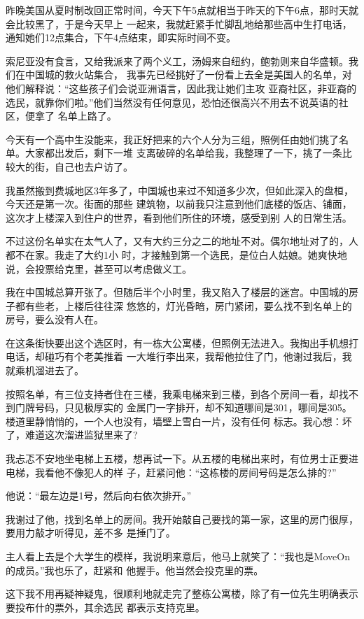 ﻿\documentclass[11pt]{article}
\begin{document}
昨晚美国从夏时制改回正常时间，今天下午5点就相当于昨天的下午6点，那时天就会比较黑了，于是今天早上
一起来，我就赶紧手忙脚乱地给那些高中生打电话，通知她们12点集合，下午4点结束，即实际时间不变。

索尼亚没有食言，又给我派来了两个义工，汤姆来自纽约，鲍勃则来自华盛顿。我们在中国城的救火站集合，
我事先已经挑好了一份看上去全是美国人的名单，对他们解释说：``这些孩子们会说亚洲语言，因此我让她们主攻
亚裔社区，非亚裔的选民，就靠你们啦。''他们当然没有任何意见，恐怕还很高兴不用去不说英语的社区，便拿了
名单上路了。

今天有一个高中生没能来，我正好把来的六个人分为三组，照例任由她们挑了名单。大家都出发后，剩下一堆
支离破碎的名单给我，我整理了一下，挑了一条比较大的街，自己也去户访了。

我虽然搬到费城地区3年多了，中国城也来过不知道多少次，但如此深入的盘桓，今天还是第一次。街面的那些
建筑物，以前我只注意到他们底楼的饭店、铺面，这次才上楼深入到住户的世界，看到他们所住的环境，感受到别
人的日常生活。

不过这份名单实在太气人了，又有大约三分之二的地址不对。偶尔地址对了的，人都不在家。我走了大约1小
时，才接触到第一个选民，是位白人姑娘。她爽快地说，会投票给克里，甚至可以考虑做义工。

我在中国城总算开张了。但随后半个小时里，我又陷入了楼层的迷宫。中国城的房子都有些老，上楼后往往深
悠悠的，灯光昏暗，房门紧闭，要么找不到名单上的房号，要么没有人在。

在这条街快要出这个选区时，有一栋大公寓楼，但照例无法进入。我掏出手机想打电话，却碰巧有个老美推着
一大堆行李出来，我帮他拉住了门，他谢过我后，我就乘机溜进去了。

按照名单，有三位支持者住在三楼，我乘电梯来到三楼，到各个房间一看，却找不到门牌号码，只见极厚实的
金属门一字排开，却不知道哪间是301，哪间是305。楼道里静悄悄的，一个人也没有，墙壁上雪白一片，没有任何
标志。我心想：坏了，难道这次溜进监狱里来了?

我忐忑不安地坐电梯上五楼，想再试一下。从五楼的电梯出来时，有位男士正要进电梯，我看他不像犯人的样
子，赶紧问他：``这栋楼的房间号码是怎么排的?''

他说：``最左边是1号，然后向右依次排开。''

我谢过了他，找到名单上的房间。我开始敲自己要找的第一家，这里的房门很厚，要用力敲才听得见，差不多
是捶门了。

主人看上去是个大学生的模样，我说明来意后，他马上就笑了：``我也是MoveOn的成员。''我也乐了，赶紧和
他握手。他当然会投克里的票。

这下我不用再疑神疑鬼，很顺利地就走完了整栋公寓楼，除了有一位先生明确表示要投布什的票外，其余选民
都表示支持克里。
\end{document}
